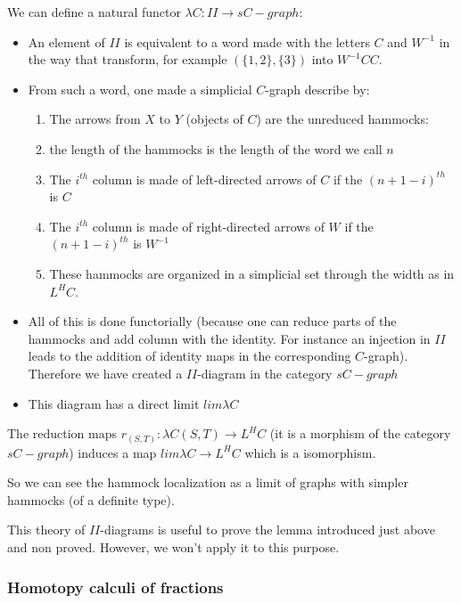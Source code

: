 \begin{refsection}
We can define a natural functor $\lambda C : II \rightarrow sC-graph$:
\begin{itemize}
\item An element of $II$ is equivalent to a word made with the letters $C$ and $W^{-1}$ in the way that transform, for example $(\{1,2\},\{3\})$ into $W^{-1} C C$.
\item From such a word, one made a simplicial $C$-graph describe by:
\begin{enumerate}
\item The arrows from $X$ to $Y$ (objects of $C$) are the unreduced hammocks:
\item the length of the hammocks is the length of the word we call $n$
\item The $i^{th}$ column is made of left-directed arrows of $C$ if the $(n+1-i)^{th}$ is $C$
\item The $i^{th}$ column is made of right-directed arrows of $W$ if the $(n+1-i)^{th}$ is $W^{-1}$  
\item These hammocks are organized in a simplicial set through the width as in $L^H C$.
\end{enumerate}
\item All of this is done functorially (because one can reduce parts of the hammocks and add column with the identity. For instance an injection in $II$ leads to the addition of identity maps in the corresponding $C$-graph). Therefore we have created a $II$-diagram in the category $sC-graph$
\item This diagram has a direct limit $lim \lambda C$
\end{itemize}


\begin{prop}
The reduction maps $r_{(S,T)} : \lambda C (S,T) \rightarrow L^H C$ (it is a morphism of the category $sC-graph$) induces a map $lim \lambda C \rightarrow L^H C$ which is a isomorphism.
\end{prop}

So we can see the hammock localization as a limit of graphs with simpler hammocks (of a definite type).

\begin{rmk}
This theory of $II$-diagrams is useful to prove the lemma introduced just above and non proved. However, we won't apply it to this purpose.
\end{rmk}

\subsubsection{Homotopy calculi of fractions}


\end{refsection}
